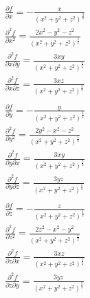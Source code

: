 \documentclass[a4paper, 12pt]{article}
\begin{document}
\begin{enumerate}
\begin{paracol}{3}
\begin{align*}
  &\frac{\partial f}{\partial x} = -\frac{x}{(x^2+y^2+z^2)^\frac{3}{2}} \\
  &\frac{\partial^2 f}{\partial x^2} = \frac{2x^2-y^2-z^2}{(x^2+y^2+z^2)^\frac{5}{2}}  \\
  &\frac{\partial^2 f}{\partial x \partial y} = \frac{3xy}{(x^2+y^2+z^2)^\frac{5}{2}}  \\
  &\frac{\partial^2 f}{\partial x \partial z} = \frac{3xz}{(x^2+y^2+z^2)^\frac{5}{2}}  \\
\end{align*}
\switchcolumn
\begin{align*}
  &\frac{\partial f}{\partial y} = -\frac{y}{(x^2+y^2+z^2)^\frac{3}{2}} \\
  &\frac{\partial^2 f}{\partial y^2} = \frac{2y^2-x^2-z^2}{(x^2+y^2+z^2)^\frac{5}{2}} \\
  &\frac{\partial^2 f}{\partial y \partial x} = \frac{3xy}{(x^2+y^2+z^2)^\frac{5}{2}} \\
  &\frac{\partial^2 f}{\partial y \partial z} = \frac{3yz}{(x^2+y^2+z^2)^\frac{5}{2}}  \\
\end{align*}
\switchcolumn
\begin{align*}
  &\frac{\partial f}{\partial z} = -\frac{z}{(x^2+y^2+z^2)^\frac{3}{2}} \\
  &\frac{\partial^2 f}{\partial z^2} = \frac{2z^2-x^2-y^2}{(x^2+y^2+z^2)^\frac{5}{2}} \\
  &\frac{\partial^2 f}{\partial z \partial x} = \frac{3xz}{(x^2+y^2+z^2)^\frac{5}{2}} \\
  &\frac{\partial^2 f}{\partial z \partial y} = \frac{3yz}{(x^2+y^2+z^2)^\frac{5}{2}} \\
\end{align*}
\end{paracol}
\end{enumerate}
\end{document}
